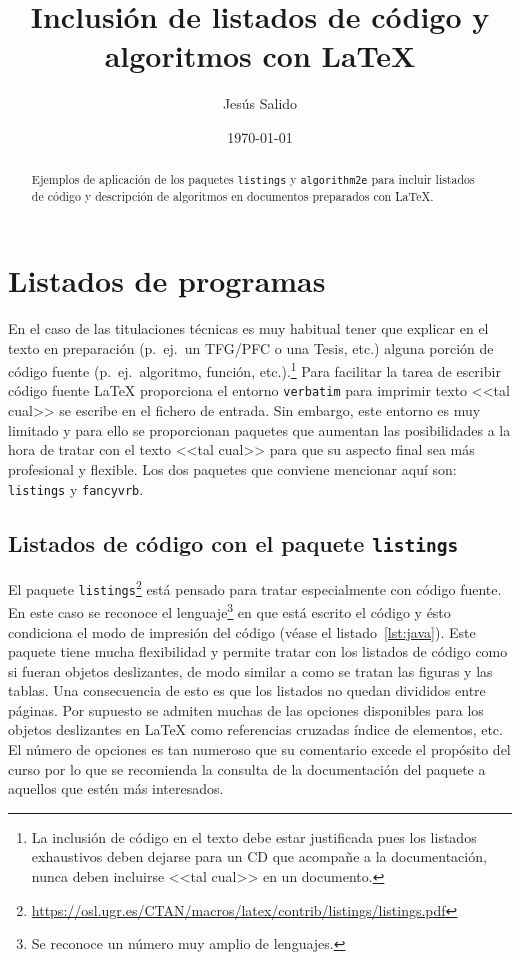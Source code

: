 \documentclass[11pt,a4paper]{article}
\author{Jesús Salido}
\title{Inclusión de listados de código y algoritmos con \LaTeX{}}
\date{\today}
\begin{document}
\maketitle

\begin{abstract}
	Ejemplos de aplicación de los paquetes \texttt{listings} y \texttt{algorithm2e} para incluir listados de código y descripción de algoritmos en documentos preparados con  \LaTeX{}.
\end{abstract}

\renewcommand{\lstlistlistingname}{Índice de listados} %
\renewcommand{\lstlistingname}{Listado} %

\tableofcontents
\lstlistoflistings
\listofalgorithms


\section{Listados de programas}
En el caso de las titulaciones técnicas es muy habitual tener que explicar en el texto en preparación (p.~ej.\ un TFG/PFC o una Tesis, etc.) alguna porción de código fuente (p.~ej.\ algoritmo, función, etc.).\footnote{La inclusión de código en el texto debe estar justificada pues los listados exhaustivos deben dejarse para un CD que acompañe a la documentación, nunca deben incluirse <<tal cual>> en un documento.} Para facilitar la tarea de escribir código fuente \LaTeX{} proporciona el entorno \texttt{verbatim} para imprimir texto <<tal cual>> se escribe en el fichero de entrada. Sin embargo, este entorno es muy limitado y para ello se proporcionan paquetes que aumentan las posibilidades a la hora de tratar con el texto <<tal cual>> para que su aspecto final sea más profesional y flexible. Los dos paquetes que conviene mencionar aquí son: \texttt{listings} y \texttt{fancyvrb}.


\subsection{Listados de código con el paquete \texttt{listings}}
El paquete \texttt{listings}\footnote{\url{https://osl.ugr.es/CTAN/macros/latex/contrib/listings/listings.pdf}} está pensado para tratar especialmente con código fuente. En este caso se reconoce el lenguaje\footnote{Se reconoce un número muy amplio de lenguajes.} en que está escrito el código y ésto condiciona el modo de impresión del código (véase el listado~\ref{lst:java}). Este paquete tiene mucha flexibilidad y permite tratar con los listados de código como si fueran objetos deslizantes, de modo similar a como se tratan las figuras y las tablas. Una consecuencia de esto es que los listados no quedan divididos entre páginas. Por supuesto se admiten muchas de las opciones disponibles para los objetos deslizantes en \LaTeX{} como referencias cruzadas índice de elementos, etc. El número de opciones es tan numeroso que su comentario excede el propósito del curso por lo que se recomienda la consulta de la documentación del paquete a aquellos que estén más interesados.
\end{document}
